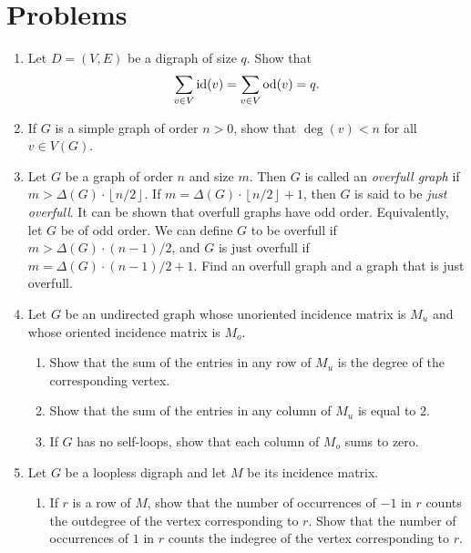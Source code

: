 
\section{Problems}

\begin{enumerate}
\item Let $D = (V, E)$ be a digraph of size $q$. Show that
  \[
  \sum_{v \in V} \operatorname*{id}(v)
  =
  \sum_{v \in V} \operatorname*{od}(v)
  =
  q.
  \]

\item If $G$ is a simple graph of order $n > 0$, show that
  $\deg(v) < n$ for all $v \in V(G)$.

\item Let $G$ be a graph of order $n$ and size $m$. Then $G$ is called
  an \emph{overfull graph} if
  $m > \Delta(G) \cdot \left\lfloor n / 2 \right\rfloor$. If
  $m = \Delta(G) \cdot \left\lfloor n / 2 \right\rfloor + 1$, then $G$
  is said to be \emph{just overfull}. It can be shown that overfull
  graphs have odd order. Equivalently, let $G$ be of odd order. We can
  define $G$ to be overfull if $m > \Delta(G) \cdot (n-1)/2$,
  and $G$ is just overfull if $m = \Delta(G) \cdot (n-1)/2 + 1$. Find
  an overfull graph and a graph that is just overfull.

\item Let $G$ be an undirected graph whose unoriented incidence matrix
  is $M_u$ and whose oriented incidence matrix is $M_o$.
  \begin{enumerate}
  \item Show that the sum of the entries in any row of $M_u$ is the
    degree of the corresponding vertex.

  \item Show that the sum of the entries in any column of $M_u$ is
    equal to $2$.

  \item If $G$ has no self-loops, show that each column of $M_o$ sums
    to zero.
  \end{enumerate}

\item Let $G$ be a loopless digraph and let $M$ be its incidence
  matrix.
  \begin{enumerate}
  \item If $r$ is a row of $M$, show that the number of occurrences of
    $-1$ in $r$ counts the outdegree of the vertex corresponding to
    $r$. Show that the number of occurrences of $1$ in $r$ counts the
    indegree of the vertex corresponding to $r$.


\end{enumerate}
\end{enumerate}
